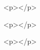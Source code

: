 \documentclass[a4paper,man,hidelinks,floatsintext]{apa7}
\begin{document}
        <p></p>
      
    
      
      
    
      
        <p></p>
      
    
      
      
    
      
        <p></p>









\end{document}
